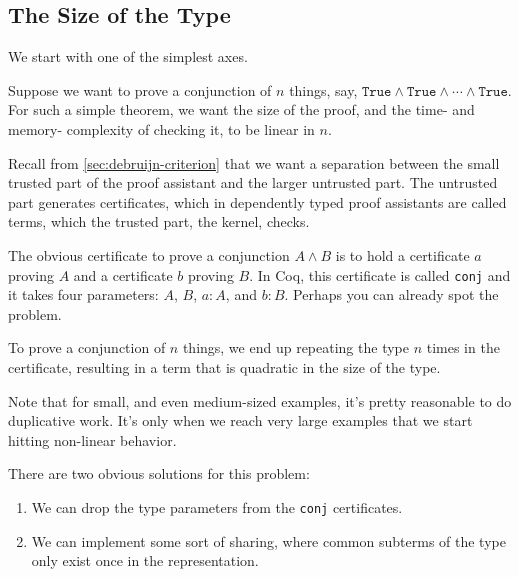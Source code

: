 \subsection{The Size of the Type}

We start with one of the simplest axes.

Suppose we want to prove a conjunction of $n$ things, say, $\texttt{True} \wedge \texttt{True} \wedge \cdots \wedge \texttt{True}$.
For such a simple theorem, we want the size of the proof, and the time- and memory- complexity of checking it, to be linear in $n$.

Recall from \autoref{sec:debruijn-criterion} that we want a separation between the small trusted part of the proof assistant and the larger untrusted part.
The untrusted part generates certificates, which in dependently typed proof assistants are called terms, which the trusted part, the kernel, checks.

The obvious certificate to prove a conjunction $A \wedge B$ is to hold a certificate $a$ proving $A$ and a certificate $b$ proving $B$.
In Coq, this certificate is called \texttt{conj} and it takes four parameters: $A$, $B$, $a : A$, and $b : B$.
Perhaps you can already spot the problem.

To prove a conjunction of $n$ things, we end up repeating the type $n$ times in the certificate, resulting in a term that is quadratic in the size of the type.

Note that for small, and even medium-sized examples, it's pretty reasonable to do duplicative work.
It's only when we reach very large examples that we start hitting non-linear behavior.

There are two obvious solutions for this problem:
\begin{enumerate}
    \item
    We can drop the type parameters from the \texttt{conj} certificates.
    \item
    We can implement some sort of sharing, where common subterms of the type only exist once in the representation.
\end{enumerate}

